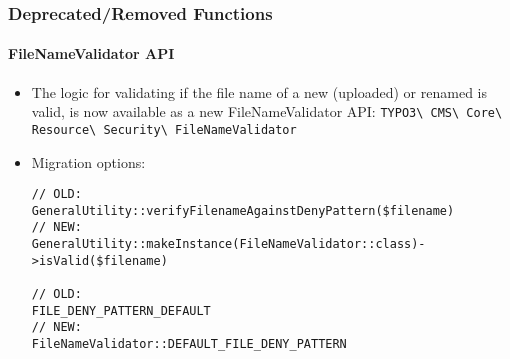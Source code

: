 
\begin{frame}[fragile]
	\frametitle{Deprecated/Removed Functions}
	\framesubtitle{FileNameValidator API}

	\lstset{basicstyle=\tiny\ttfamily}

	\begin{itemize}
		\item The logic for validating if the file name of a new (uploaded) or
			renamed is valid, is now available as a new FileNameValidator API:\newline
			\small
				\texttt{TYPO3\textbackslash
					CMS\textbackslash
					Core\textbackslash
					Resource\textbackslash
					Security\textbackslash
					FileNameValidator}
			\normalsize

		\item Migration options:
\begin{lstlisting}
// OLD:
GeneralUtility::verifyFilenameAgainstDenyPattern($filename)
// NEW:
GeneralUtility::makeInstance(FileNameValidator::class)->isValid($filename)

// OLD:
FILE_DENY_PATTERN_DEFAULT
// NEW:
FileNameValidator::DEFAULT_FILE_DENY_PATTERN
\end{lstlisting}

	\end{itemize}

\end{frame}


